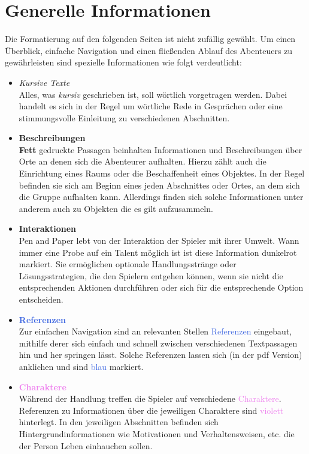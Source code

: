 \thispagestyle{fancy-info}
\section*{Generelle Informationen}

Die Formatierung auf den folgenden Seiten ist nicht zufällig gewählt. Um einen Überblick, einfache Navigation und
einen fließenden Ablauf des Abenteuers zu gewährleisten sind spezielle Informationen wie folgt verdeutlicht:

\begin{itemize}
  \item \textit{Kursive Texte} \\
  Alles, was \textit{kursiv} geschrieben ist, soll wörtlich vorgetragen werden. Dabei handelt es sich in der Regel
  um wörtliche Rede in Gesprächen oder eine stimmungsvolle Einleitung zu verschiedenen Abschnitten.

  \item \textbf{Beschreibungen} \\
  \textbf{Fett} gedruckte Passagen beinhalten Informationen und Beschreibungen über Orte an denen sich die
  Abenteurer aufhalten. Hierzu zählt auch die Einrichtung eines Raums oder die Beschaffenheit eines Objektes.
  In der Regel befinden sie sich am Beginn eines jeden Abschnittes oder Ortes, an dem sich die Gruppe aufhalten
  kann. Allerdings finden sich solche Informationen unter anderem auch zu Objekten die es gilt aufzusammeln.

  \item \textcolor{RoyalRed}{\textbf{Interaktionen}} \\
  Pen and Paper lebt von der \textcolor{RoyalRed}{Interaktion} der Spieler mit ihrer Umwelt. Wann immer eine Probe auf ein Talent
  möglich ist ist diese Information \textcolor{RoyalRed}{dunkelrot} markiert. Sie ermöglichen optionale Handlungsstränge oder
  Lösungsstrategien, die den Spielern entgehen können, wenn sie nicht die entsprechenden Aktionen durchführen oder
  sich für die entsprechende Option entscheiden.

  \item \textcolor{RoyalBlue}{\textbf{Referenzen}} \\
  Zur einfachen Navigation sind an relevanten Stellen \textcolor{RoyalBlue}{Referenzen} eingebaut, mithilfe derer sich einfach und
  schnell zwischen verschiedenen Textpassagen hin und her springen lässt. Solche Referenzen lassen sich (in der pdf
  Version) anklichen und sind \textcolor{RoyalBlue}{blau} markiert.

  \item \textcolor{violet}{\textbf{Charaktere}} \\
  Während der Handlung treffen die Spieler auf verschiedene \textcolor{violet}{Charaktere}. Referenzen zu Informationen über
  die jeweiligen Charaktere sind \textcolor{violet}{violett} hinterlegt. In den jeweiligen Abschnitten befinden sich
  Hintergrundinformationen wie Motivationen und Verhaltensweisen, etc. die der Person Leben einhauchen sollen.

\end{itemize}
